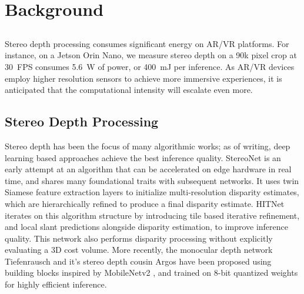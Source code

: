 \section{Background}\label{sec:background}

\subsection{}
Stereo depth processing consumes significant energy on AR/VR platforms.
For instance, on a Jetson Orin Nano, we measure stereo depth on a 90k pixel crop at 30~FPS consumes 5.6~W of power, or 400~mJ per inference.
As AR/VR devices employ higher resolution sensors to achieve more immersive experiences, it is anticipated that the computational intensity will escalate even more.

\subsection{Stereo Depth Processing}
Stereo depth has been the focus of many algorithmic works; as of writing, deep learning based approaches achieve the best inference quality. 
StereoNet \cite{stereonet} is an early attempt at an algorithm that can be accelerated on edge hardware in real time, and shares many foundational traits with subsequent networks. 
It uses twin Siamese feature extraction layers to initialize multi-resolution disparity estimates, which are hierarchically refined to produce a final disparity estimate. 
HITNet \cite{hitnet} iterates on this algorithm structure by introducing tile based iterative refinement, and local slant predictions alongside disparity estimation, to improve inference quality. 
This network also performs disparity processing without explicitly evaluating a 3D cost volume. 
More recently, the monocular depth network Tiefenrausch and it's stereo depth cousin Argos \cite{tiefenrausch} have been proposed using building blocks inspired by MobileNetv2 \cite{mobilenetv2}, and trained on 8-bit quantized weights for highly efficient inference.

